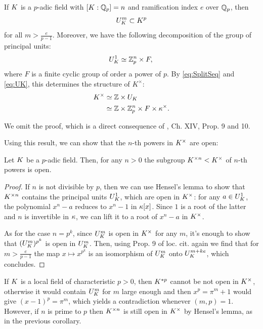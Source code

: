 \documentclass[a4paper, oneside]{memoir}
\begin{document}
\begin{theorem}\label{thm:StructureLocalFields}
	If $K$ is a $p$-adic field with $[K:\mathbb{Q}_p]=n$ and ramification index $e$ over $\mathbb{Q}_p$, then
	\[
		U_K^m \subset K^p
	\]
	for all $m> \frac{e}{p-1}$. Moreover, we have the following decomposition of the group of principal units:
	\begin{equation*}
		U_K^1 \simeq \mathbb{Z}_p^n \times F, \\
	\end{equation*}
	where $F$ is a finite cyclic group of order a power of $p$.
	By \eqref{eq:SplitSeq} and \eqref{eq:UK}, this determines the structure of $K^\times$:
	\begin{align*}
		K^\times & \simeq \mathbb{Z} \times U_K                             \\
		          & \simeq \mathbb{Z} \times \mathbb{Z}_p^n \times F \times \kappa^\times.
	\end{align*}
\end{theorem}

We omit the proof, which is a direct consequence of \cite{SerreCL}, Ch. XIV, Prop. 9 and 10.

Using this result, we can show that the $n$-th powers in $K^\times$ are open:
\begin{corollary}\label{cor:KxOpen}
	Let $K$ be a $p$-adic field. Then, for any $n>0$ the subgroup $K^{\times n}<K^\times$ of $n$-th powers is open.
\end{corollary}
\begin{proof}
	If $n$ is not divisible by $p$, then we can use Hensel's lemma to show that $K^{\times n}$ contains the principal units $U_K^1$, which are open in $K^\times$: for any $a\in U_K^1$, the polynomial $x^n-a$ reduces to $x^{n} - 1$ in $\kappa[x]$. Since $1$ is a root of the latter and $n$ is invertible in $\kappa$, we can lift it to a root of $x^n-a$ in $K^\times$.

	As for the case $n=p^k$, since $U_K^m$ is open in $K^\times$ for any $m$, it's enough to show that $(U_K^m)^{p^k}$ is open in $U_K^m$.
	Then, using Prop. 9 of loc. cit. again we find that for $m>\frac{e}{p-1}$ the map $x\mapsto x^{p^k}$ is an isomorphism of $U_K^m$ onto $U_K^{m+ke}$, which concludes.
\end{proof}

\begin{remark}\label{rm:KxOpenCharP}
	If $K$ is a local field of characteristic $p>0$, then $K^{*p}$ cannot be not open in $K^\times$, otherwise it would contain $U_K^m$ for $m$ large enough and then $x^p = \pi^m + 1$ would give $(x-1)^p = \pi^m$, which yields a contradiction whenever $(m,p)=1$.
	However, if $n$ is prime to $p$ then $K^{\times n}$ is still open in $K^\times$ by Hensel's lemma, as in the previous corollary.
\end{remark}
\end{document}
